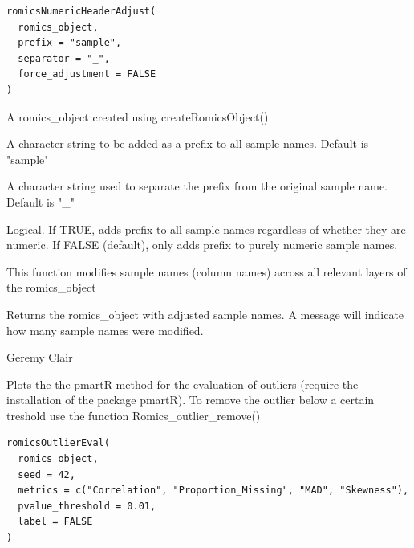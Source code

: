 \documentclass[a4paper]{book}
\begin{document}
%
\begin{Usage}
\begin{verbatim}
romicsNumericHeaderAdjust(
  romics_object,
  prefix = "sample",
  separator = "_",
  force_adjustment = FALSE
)
\end{verbatim}
\end{Usage}
%
\begin{Arguments}
\begin{ldescription}
\item[\code{romics\_object}] A romics\_object created using createRomicsObject()

\item[\code{prefix}] A character string to be added as a prefix to all sample names. Default is "sample"

\item[\code{separator}] A character string used to separate the prefix from the original sample name. Default is "\_"

\item[\code{force\_adjustment}] Logical. If TRUE, adds prefix to all sample names regardless of whether they are numeric.
If FALSE (default), only adds prefix to purely numeric sample names.
\end{ldescription}
\end{Arguments}
%
\begin{Details}
This function modifies sample names (column names) across all relevant layers of the romics\_object
\end{Details}
%
\begin{Value}
Returns the romics\_object with adjusted sample names. A message will indicate
how many sample names were modified.
\end{Value}
%
\begin{Author}
Geremy Clair
\end{Author}
%
\begin{Description}
Plots the the pmartR method for the evaluation of outliers (require the installation of the package pmartR). To remove the outlier below a certain treshold use the function Romics\_outlier\_remove()
\end{Description}
%
\begin{Usage}
\begin{verbatim}
romicsOutlierEval(
  romics_object,
  seed = 42,
  metrics = c("Correlation", "Proportion_Missing", "MAD", "Skewness"),
  pvalue_threshold = 0.01,
  label = FALSE
)
\end{verbatim}
\end{Usage}
\end{document}
